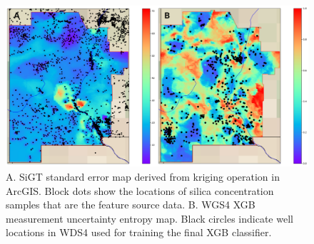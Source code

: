 \begin{figure}[!htp]
\centering
\includegraphics[width=\textwidth]{templates/images/Figure-MU_StdErr_vs_Uncert.png}
\caption[SiGT standard error and model entropy]
{A. SiGT standard error map derived from kriging operation in ArcGIS. Block dots show the locations of silica concentration samples that are the feature source data. B. WGS4 XGB measurement uncertainty entropy map. Black circles indicate well locations in WDS4 used for training the final XGB classifier. }
\label{fig:mu_stderr_entropy}
\end{figure}
